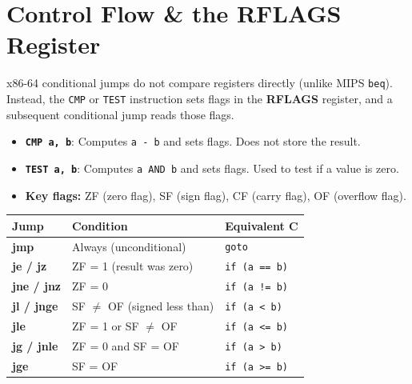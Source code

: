 \documentclass[11pt, letterpaper]{article}
\begin{document}
\section*{Control Flow \& the RFLAGS Register}

x86-64 conditional jumps do not compare registers directly (unlike MIPS \texttt{beq}). Instead, the \texttt{CMP} or \texttt{TEST} instruction sets flags in the \textbf{RFLAGS} register, and a subsequent conditional jump reads those flags.

\begin{itemize}[noitemsep]
  \item \textbf{\texttt{CMP a, b}}: Computes \texttt{a - b} and sets flags. Does not store the result.
  \item \textbf{\texttt{TEST a, b}}: Computes \texttt{a AND b} and sets flags. Used to test if a value is zero.
  \item \textbf{Key flags:} ZF (zero flag), SF (sign flag), CF (carry flag), OF (overflow flag).
\end{itemize}

\noindent
{\renewcommand{\arraystretch}{1.5}
\begin{tabularx}{\textwidth}{>{\ttfamily\bfseries\centering\arraybackslash}p{2cm}
                              >{\raggedright\arraybackslash}X
                              >{\raggedright\arraybackslash}p{3.5cm}}
\toprule
\rowcolor{tableheaderred}
\textbf{Jump} & \textbf{Condition} & \textbf{Equivalent C} \\
\midrule
\rowcolor{rowRe} jmp  & Always (unconditional) & \texttt{goto} \\
\rowcolor{rowA}  je / jz & ZF = 1 (result was zero) & \texttt{if (a == b)} \\
\rowcolor{rowRe} jne / jnz & ZF = 0 & \texttt{if (a != b)} \\
\rowcolor{rowA}  jl / jnge & SF $\neq$ OF (signed less than) & \texttt{if (a < b)} \\
\rowcolor{rowRe} jle      & ZF = 1 or SF $\neq$ OF & \texttt{if (a <= b)} \\
\rowcolor{rowA}  jg / jnle & ZF = 0 and SF = OF & \texttt{if (a > b)} \\
\rowcolor{rowRe} jge      & SF = OF & \texttt{if (a >= b)} \\
\bottomrule
\end{tabularx}}
\end{document}
